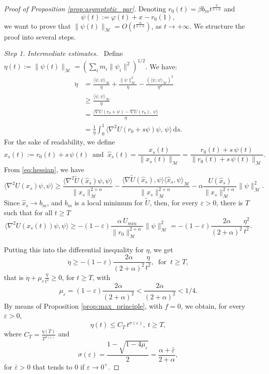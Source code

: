 \documentclass[10pt,a4paper]{amsart}
\newcommand{\ud}{\mathrm{d}}
\begin{document}
\begin{proof}[Proof of Proposition \ref{prop:asymptotic_par}]
    Denoting $r_0(t) = \beta b_m t^{\frac{2}{2+\alpha}}$ and 
    \[
    \psi(t):=\varphi(t)+x-r_0(1),
    \]
    we want to prove that $\|\psi(t)\|_\mathcal{M}=O(t^\frac{\alpha}{2+\alpha})$, as $t \rightarrow+\infty$. We structure the proof into several steps.

    \smallskip
    \emph{Step 1. Intermediate estimates.} \ 
    Define $\eta(t):=\|\psi(t)\|_\mathcal{M}=\left(\sum_i m_i \|\psi_i\|^2\right)^{1/2}$. We have:
\[
\begin{split}
\ddot \eta &= \frac{\langle\ddot \psi, \psi\rangle_\mathcal{M}}{\eta} + \frac{\|\dot \psi\|_\mathcal{M}^2}{\eta} - \frac{\left(\langle \dot \psi, \psi\rangle_\mathcal{M}\right)^2}{\eta^3}
\\
&\ge \frac{\langle \ddot \psi, \psi\rangle_\mathcal{M}}{\eta}
\\
&=\frac{\langle \nabla U(r_0 + \psi) - \nabla U(r_0),\,\psi\rangle}{\eta}\\
& = \frac{1}{\eta} \int_{0}^{1}\langle\nabla^2 U(r_0+s\psi)\psi,\,\psi\rangle \, \ud s.
\end{split}
\]
For the sake of readability, we define
\[
x_s(t):=r_0(t)+s\,\psi(t) \ \mbox{ and } \ \hat x_s(t)=\frac{x_s(t)}{\|x_s(t)\|_{\mathcal M}}=\frac{r_0(t)+s\,\psi(t)}{\|r_0(t)+s\,\psi(t)\|_{\mathcal M}}.
\]
From \eqref{eq:hessian}, we have
\[
\langle\nabla^2 U(x_s)\psi, \psi\rangle \ge  \frac{\langle\nabla^2\tilde  U(\hat x_s)\psi,\psi\rangle}{\|x_s\|_{\mathcal M}^{2+\alpha}} - \frac{\langle  \nabla\tilde U(\hat x_s), \psi\rangle \langle \hat x_s, \psi\rangle_{\mathcal M}}{\|x_s\|_{\mathcal M}^{2+\alpha}} - \alpha\frac{U(\hat x_s)}{\|x_s\|_{\mathcal M}^{2+\alpha}}\|\psi\|_{\mathcal M}^2.
\]
Since $\hat x_s \to b_m$, and $b_m$ is a local minimum for $\tilde U$, then, for every $\varepsilon>0$, there is $T$ such that for all $t\ge T$
\[
\langle\nabla^2 U(x_s(t))\psi, \psi\rangle \ge -(1-\varepsilon) \frac{\alpha\,U_{min}}{\|r_0\|_{\mathcal M}^{2+\alpha}} \|\psi\|_\mathcal{M}^2 = -(1-\varepsilon)\frac{2\alpha}{(2+\alpha)^2}\frac{\eta^2}{ {t^2}}.
\]

Putting this into the differential inequality for $\eta$, we get
\[
\ddot\eta \ge  -(1-\varepsilon)\frac{2\alpha}{(2+\alpha)^2}\frac{\eta}{t^2}, \ \mbox{ for } \ t \ge T,
\]
that is $\ddot \eta + \mu_\varepsilon \frac{\eta}{t^2} \ge 0$, for $t \ge T$, with
\[
\mu_\varepsilon = (1-\varepsilon)\frac{2\alpha}{(2+\alpha)^2}< \frac{2\alpha}{(2+\alpha)^2}<1/4.
\]
By means of Proposition \ref{prop:max_principle}, with $f=0$, we obtain, for every $\varepsilon>0$,
\begin{equation}
    \label{eq:gamma_eps}
\eta(t) \le C_T\,t^{\sigma(\varepsilon)}, \ t \ge T,
\end{equation}
where $C_T=\frac{\eta(T)}{T^{\sigma(\varepsilon)}}$ and
\[
\sigma(\varepsilon) = \frac{1-\sqrt{1-4\mu_\varepsilon}}{2} = \frac{\alpha+\bar\varepsilon}{2+\alpha},
\]
for $\bar\varepsilon >0$ that tends to $0$ if $\varepsilon \to 0^+$.


\end{proof}
\end{document}
